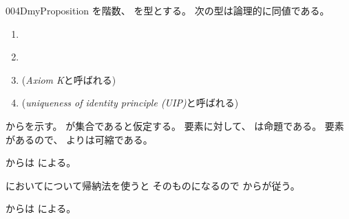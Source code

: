 \documentclass[index]{subfiles}
\begin{document}
\begin{myBlock}{004D}{myProposition}
  を階数、
  を型とする。
  次の型は論理的に同値である。
  \begin{enumerate}
  \item \label{004D:0000} 
  \item \label{004D:0001} 
  \item \label{004D:0002} 
    (\emph{Axiom K}と呼ばれる)
  \item \label{004D:0003} 
    (\emph{uniqueness of identity principle (UIP)}と呼ばれる)
  \end{enumerate}
\end{myBlock}
\begin{myProof}
  からを示す。
  が集合であると仮定する。
  要素に対して、
  は命題である。
  要素があるので、
  よりは可縮である。

  からは
  による。

  においてについて帰納法を使うと
  そのものになるので
  からが従う。

  からは
  による。
\end{myProof}
\end{document}
